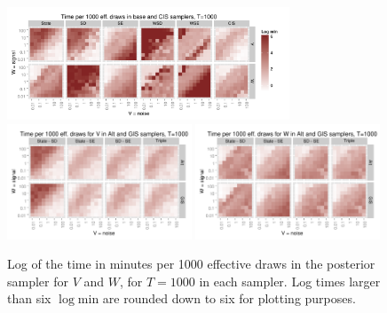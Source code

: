 \documentclass{article}
\begin{document}
\begin{figure}[!h]
\centering
\includegraphics[width=0.75\textwidth]{basecistimeplot1000}
\includegraphics[width=0.49\textwidth]{altgisVtimeplot1000}
\includegraphics[width=0.49\textwidth]{altgisWtimeplot1000}
\caption{Log of the time in minutes per 1000 effective draws in the posterior sampler for $V$ and $W$, for $T=1000$ in each sampler. Log times larger than six $\log \mathrm{min}$ are rounded down to six for plotting purposes.}
\label{baseinttimeplot3}
\end{figure}



\clearpage

\end{document}
